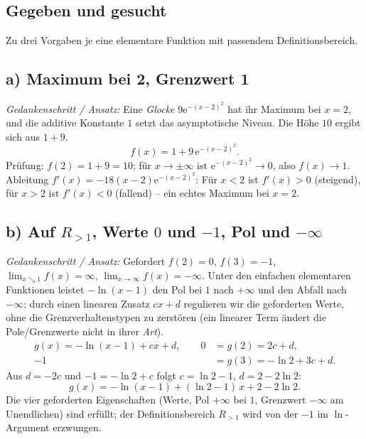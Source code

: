 
\subsection*{Gegeben und gesucht}
Zu drei Vorgaben je eine elementare Funktion mit passendem
Definitionsbereich.

\subsection*{a) Maximum bei 2, Grenzwert 1}
\emph{Gedankenschritt / Ansatz:} Eine \emph{Glocke} $9\mathrm e^{-(x-2)^2}$
hat ihr Maximum bei $x=2$, und die additive Konstante $1$ setzt das
asymptotische Niveau. Die Höhe $10$ ergibt sich aus $1+9$.
\begin{equation*}
  f(x)=1+9\,\mathrm e^{-(x-2)^2}.
\end{equation*}
Prüfung: $f(2)=1+9=10$; für $x\to\pm\infty$ ist
$\mathrm e^{-(x-2)^2}\to0$, also $f(x)\to1$. Ableitung
$f'(x)=-18(x-2)\mathrm e^{-(x-2)^2}$: Für $x<2$ ist $f'(x)>0$ (steigend),
für $x>2$ ist $f'(x)<0$ (fallend) -- ein echtes Maximum bei $x=2$.

\subsection*{b) Auf $R_{>1}$, Werte $0$ und $-1$, Pol und $-\infty$}
\emph{Gedankenschritt / Ansatz:} Gefordert $f(2)=0$, $f(3)=-1$,
$\lim_{x\searrow1}f(x)=\infty$, $\lim_{x\to\infty}f(x)=-\infty$. Unter den
einfachen elementaren Funktionen leistet $-\ln(x-1)$ den Pol bei $1$ nach
$+\infty$ und den Abfall nach $-\infty$; durch einen linearen Zusatz
$cx+d$ regulieren wir die geforderten Werte, ohne die Grenzverhaltenstypen
zu zerstören (ein linearer Term ändert die Pole/Grenzwerte nicht in ihrer
\emph{Art}).
\begin{align*}
  g(x)=-\ln(x-1)+cx+d, \qquad
  0&=g(2)=2c+d,\\
  -1&=g(3)=-\ln 2+3c+d .
\end{align*}
Aus $d=-2c$ und $-1=-\ln2+c$ folgt $c=\ln2-1$, $d=2-2\ln2$:
\begin{equation*}
  g(x)=-\ln(x-1)+(\ln2-1)\,x+2-2\ln2 .
\end{equation*}
Die vier geforderten Eigenschaften (Werte, Pol $+\infty$ bei $1$,
Grenzwert $-\infty$ am Unendlichen) sind erfüllt; der Definitionsbereich
$R_{>1}$ wird von der $-1$ im $\ln$-Argument erzwungen.

